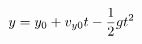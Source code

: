 \documentclass[preview]{standalone}
\begin{document}
\begin{align*}
\special{dvisvgm:raw <g id='unique000'>}y = y_0 + v_{y0}t - \frac{1}{2}gt^2\special{dvisvgm:raw </g>}
\end{align*}
\end{document}
